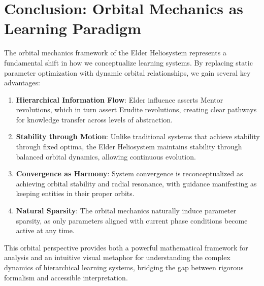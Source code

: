 \section{Conclusion: Orbital Mechanics as Learning Paradigm}

The orbital mechanics framework of the Elder Heliosystem represents a fundamental shift in how we conceptualize learning systems. By replacing static parameter optimization with dynamic orbital relationships, we gain several key advantages:

\begin{enumerate}
    \item \textbf{Hierarchical Information Flow}: Elder influence asserts Mentor revolutions, which in turn assert Erudite revolutions, creating clear pathways for knowledge transfer across levels of abstraction.
    
    \item \textbf{Stability through Motion}: Unlike traditional systems that achieve stability through fixed optima, the Elder Heliosystem maintains stability through balanced orbital dynamics, allowing continuous evolution.
    
    \item \textbf{Convergence as Harmony}: System convergence is reconceptualized as achieving orbital stability and radial resonance, with guidance manifesting as keeping entities in their proper orbits.
    
    \item \textbf{Natural Sparsity}: The orbital mechanics naturally induce parameter sparsity, as only parameters aligned with current phase conditions become active at any time.
\end{enumerate}

This orbital perspective provides both a powerful mathematical framework for analysis and an intuitive visual metaphor for understanding the complex dynamics of hierarchical learning systems, bridging the gap between rigorous formalism and accessible interpretation.